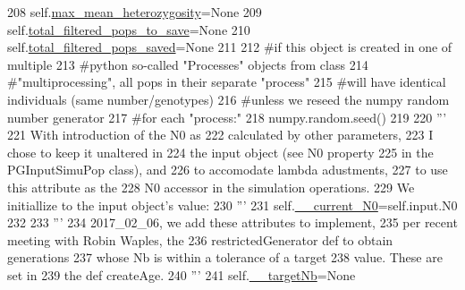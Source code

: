 \begin{DoxyCode}
208         self.\hyperlink{classnegui_1_1pgopsimupop_1_1PGOpSimuPop_acf0ab336f11e34a3272a26fdd28b8806}{max\_mean\_heterozygosity}=\textcolor{keywordtype}{None}
209         self.\hyperlink{classnegui_1_1pgopsimupop_1_1PGOpSimuPop_a92807fcd5299967e92a1565aa3ba6f2a}{total\_filtered\_pops\_to\_save}=\textcolor{keywordtype}{None}
210         self.\hyperlink{classnegui_1_1pgopsimupop_1_1PGOpSimuPop_a8ff6361fd3db41e77799417265f6e856}{total\_filtered\_pops\_saved}=\textcolor{keywordtype}{None}
211 
212         \textcolor{comment}{#if this object is created in one of multiple}
213         \textcolor{comment}{#python so-called "Processes" objects from class}
214         \textcolor{comment}{#"multiprocessing", all pops in their separate "process"}
215         \textcolor{comment}{#will have identical individuals (same number/genotypes) }
216         \textcolor{comment}{#unless we reseed the numpy random number generator }
217         \textcolor{comment}{#for each "process:"}
218         numpy.random.seed()
219 
220         \textcolor{stringliteral}{'''}
221 \textcolor{stringliteral}{        With introduction of the N0 as }
222 \textcolor{stringliteral}{        calculated by other parameters,}
223 \textcolor{stringliteral}{        I chose to keep it unaltered in }
224 \textcolor{stringliteral}{        the input object (see N0 property}
225 \textcolor{stringliteral}{        in the PGInputSimuPop class), and}
226 \textcolor{stringliteral}{        to accomodate lambda adustments,}
227 \textcolor{stringliteral}{        to use this attribute as the }
228 \textcolor{stringliteral}{        N0 accessor in the simulation operations.}
229 \textcolor{stringliteral}{        We initiallize to the input object's value:}
230 \textcolor{stringliteral}{        '''}
231         self.\hyperlink{classnegui_1_1pgopsimupop_1_1PGOpSimuPop_a2f0c7a20605eb636fd7624e0472b58ed}{\_\_current\_N0}=self.input.N0
232 
233         \textcolor{stringliteral}{'''}
234 \textcolor{stringliteral}{        2017\_02\_06, we add these attributes to implement,}
235 \textcolor{stringliteral}{        per recent meeting with Robin Waples, the }
236 \textcolor{stringliteral}{        restrictedGenerator def to obtain generations}
237 \textcolor{stringliteral}{        whose Nb is within a tolerance of a target}
238 \textcolor{stringliteral}{        value.  These are set in}
239 \textcolor{stringliteral}{        the def createAge.}
240 \textcolor{stringliteral}{        '''}
241         self.\hyperlink{classnegui_1_1pgopsimupop_1_1PGOpSimuPop_a5e007cb3a648c379b48bd9210b075f82}{\_\_targetNb}=\textcolor{keywordtype}{None}

\end{DoxyCode}
